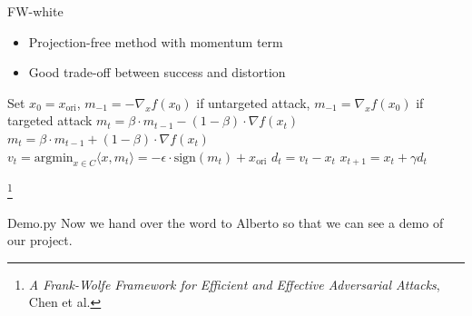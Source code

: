 \documentclass{beamer}
\theoremstyle{plain}
\theoremstyle{definition}
\newcommand\blfootnote[1]{%
  \begingroup
  \renewcommand\thefootnote{}\footnote{#1}%
  \addtocounter{footnote}{-1}%
  \endgroup
}
\begin{document}
\begin{frame}{FW-white}
\begin{itemize}
    \item Projection-free method with momentum term
    \item Good trade-off between success and distortion 
\end{itemize}
    \begin{algorithm}[H]
\caption{FW-White}\label{FW}
\begin{algorithmic}[1]
\State Set $x_0 = x_{\text{ori}}$, $m_{-1} = - \nabla_x f(x_0)$ if untargeted attack, $m_{-1} = \nabla_x f(x_0)$ if targeted attack
    \State $m_t = \beta \cdot m_{t-1} - (1-\beta) \cdot \nabla f(x_t) $ 
    \State $m_t = \beta \cdot m_{t-1} + (1-\beta) \cdot \nabla f(x_t) $ 
    \State $v_t = \text{argmin}_{x \in C} \langle x, m_t \rangle = - \epsilon \cdot \text{sign} (m_t) + x_{\text{ori}} $
    \State $d_t = v_t - x_t $
    \State $x_{t+1} = x_t + \gamma d_t $
    
\EndFor
\end{algorithmic}
\end{algorithm}

\blfootnote{\textit{A Frank-Wolfe Framework for Efficient and Effective Adversarial Attacks}, Chen et al.}
\end{frame}

\begin{frame}{Demo.py}
    Now we hand over the word to Alberto so that we can see a demo of our project. 
\end{frame}
\end{document}
